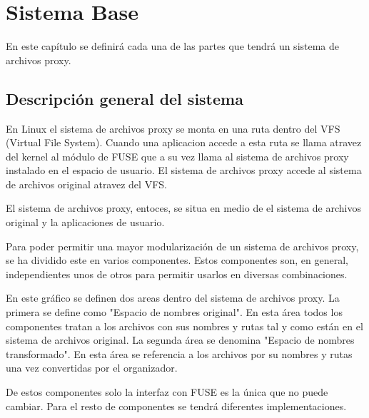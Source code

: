 \chapter{Sistema Base}
\ifpdf
    \graphicspath{{Chapter1/Chapter1Figs/PNG/}{Chapter1/Chapter1Figs/PDF/}{Chapter1/Chapter1Figs/}}
\else
    \graphicspath{{Chapter1/Chapter1Figs/EPS/}{Chapter1/Chapter1Figs/}}
\fi

En este capítulo se definirá cada una de las partes que tendrá un sistema de archivos proxy.


\section{Descripción general del sistema}

En Linux el sistema de archivos proxy se monta en una ruta dentro del VFS (Virtual File System). Cuando una aplicacion accede a esta ruta se llama atravez del kernel al módulo de FUSE que a su vez llama al sistema de archivos proxy instalado en el espacio de usuario. El sistema de archivos proxy accede al sistema de archivos original atravez del VFS.


El sistema de archivos proxy, entoces, se situa en medio de el sistema de archivos original y la aplicaciones de usuario.


Para poder permitir una mayor modularización de un sistema de archivos proxy, se ha dividido este en varios componentes. Estos componentes son, en general, independientes unos de otros para permitir usarlos en diversas combinaciones.


En este gráfico se definen dos areas dentro del sistema de archivos proxy. La primera se define como "Espacio de nombres original". En esta área todos los componentes tratan a los archivos con sus nombres y rutas tal y como están en el sistema de archivos original. La segunda área se denomina "Espacio de nombres transformado". En esta área se referencia a los archivos por su nombres y rutas una vez convertidas por el organizador.

De estos componentes solo la interfaz con FUSE es la única que no puede cambiar. Para el resto de componentes se tendrá diferentes implementaciones.


